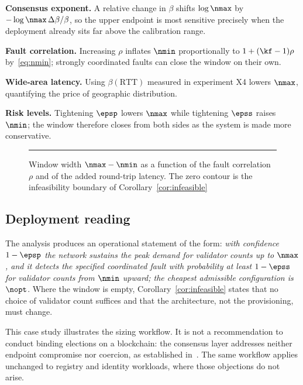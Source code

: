 \begin{enumerate*}
\item \textbf{Consensus exponent.} A relative change in $\beta$ shifts
$\log\nmax$ by $-\log\nmax\,\Delta\beta/\beta$, so the upper endpoint is most
sensitive precisely when the deployment already sits far above the calibration
range.
\item \textbf{Fault correlation.} Increasing $\rho$ inflates $\nmin$
proportionally to $1+(\kf-1)\rho$ by~\eqref{eq:nmin}; strongly coordinated
faults can close the window on their own.
\item \textbf{Wide-area latency.} Using $\beta(\text{RTT})$ measured in
experiment X4 lowers $\nmax$, quantifying the price of geographic distribution.
\item \textbf{Risk levels.} Tightening $\epsp$ lowers $\nmax$ while tightening
$\epss$ raises $\nmin$; the window therefore closes from both sides as the
system is made more conservative.
\end{enumerate*}

\begin{figure}[!t]
\centering
\rule{0.8\textwidth}{0.22\textwidth}
\caption{Window width $\nmax-\nmin$ as a function of the fault correlation
$\rho$ and of the added round-trip latency. The zero contour is the
infeasibility boundary of Corollary~\ref{cor:infeasible}}
\label{fig:sensitivity}
\end{figure}

\subsection{Deployment reading}

The analysis produces an operational statement of the form: \emph{with
confidence $1-\epsp$ the network sustains the peak demand for validator counts
up to $\nmax$, and it detects the specified coordinated fault with probability
at least $1-\epss$ for validator counts from $\nmin$ upward; the cheapest
admissible configuration is $\nopt$}. Where the window is empty,
Corollary~\ref{cor:infeasible} states that no choice of validator count
suffices and that the architecture, not the provisioning, must change.

\begin{Remark}
This case study illustrates the sizing workflow. It is not a recommendation to
conduct binding elections on a blockchain: the consensus layer addresses neither
endpoint compromise nor coercion, as established
in~\cite{springall2014,specter2020,park2021}. The same workflow applies
unchanged to registry and identity workloads, where those objections do not
arise.
\end{Remark}
